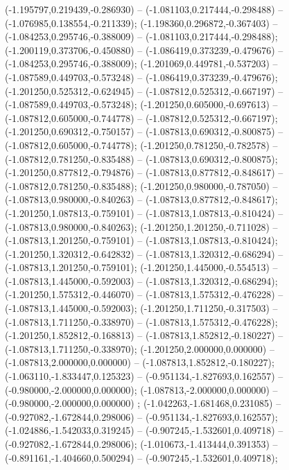  (-1.195797,0.219439,-0.286930) -- (-1.081103,0.217444,-0.298488) -- (-1.076985,0.138554,-0.211339);
 (-1.198360,0.296872,-0.367403) -- (-1.084253,0.295746,-0.388009) -- (-1.081103,0.217444,-0.298488);
 (-1.200119,0.373706,-0.450880) -- (-1.086419,0.373239,-0.479676) -- (-1.084253,0.295746,-0.388009);
 (-1.201069,0.449781,-0.537203) -- (-1.087589,0.449703,-0.573248) -- (-1.086419,0.373239,-0.479676);
 (-1.201250,0.525312,-0.624945) -- (-1.087812,0.525312,-0.667197) -- (-1.087589,0.449703,-0.573248);
 (-1.201250,0.605000,-0.697613) -- (-1.087812,0.605000,-0.744778) -- (-1.087812,0.525312,-0.667197);
 (-1.201250,0.690312,-0.750157) -- (-1.087813,0.690312,-0.800875) -- (-1.087812,0.605000,-0.744778);
 (-1.201250,0.781250,-0.782578) -- (-1.087812,0.781250,-0.835488) -- (-1.087813,0.690312,-0.800875);
 (-1.201250,0.877812,-0.794876) -- (-1.087813,0.877812,-0.848617) -- (-1.087812,0.781250,-0.835488);
 (-1.201250,0.980000,-0.787050) -- (-1.087813,0.980000,-0.840263) -- (-1.087813,0.877812,-0.848617);
 (-1.201250,1.087813,-0.759101) -- (-1.087813,1.087813,-0.810424) -- (-1.087813,0.980000,-0.840263);
 (-1.201250,1.201250,-0.711028) -- (-1.087813,1.201250,-0.759101) -- (-1.087813,1.087813,-0.810424);
 (-1.201250,1.320312,-0.642832) -- (-1.087813,1.320312,-0.686294) -- (-1.087813,1.201250,-0.759101);
 (-1.201250,1.445000,-0.554513) -- (-1.087813,1.445000,-0.592003) -- (-1.087813,1.320312,-0.686294);
 (-1.201250,1.575312,-0.446070) -- (-1.087813,1.575312,-0.476228) -- (-1.087813,1.445000,-0.592003);
 (-1.201250,1.711250,-0.317503) -- (-1.087813,1.711250,-0.338970) -- (-1.087813,1.575312,-0.476228);
 (-1.201250,1.852812,-0.168813) -- (-1.087813,1.852812,-0.180227) -- (-1.087813,1.711250,-0.338970);
 (-1.201250,2.000000,0.000000) -- (-1.087813,2.000000,0.000000) -- (-1.087813,1.852812,-0.180227);
 (-1.063110,-1.833447,0.125323) -- (-0.951134,-1.827693,0.162557) -- (-0.980000,-2.000000,0.000000);
 (-1.087813,-2.000000,0.000000) -- (-0.980000,-2.000000,0.000000) ;
 (-1.042263,-1.681468,0.231085) -- (-0.927082,-1.672844,0.298006) -- (-0.951134,-1.827693,0.162557);
 (-1.024886,-1.542033,0.319245) -- (-0.907245,-1.532601,0.409718) -- (-0.927082,-1.672844,0.298006);
 (-1.010673,-1.413444,0.391353) -- (-0.891161,-1.404660,0.500294) -- (-0.907245,-1.532601,0.409718);
